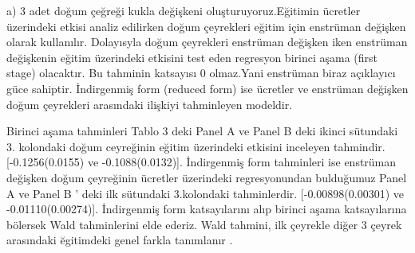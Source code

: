 \documentclass[a4paper]{article}
\begin{document}
a) 3 adet doğum çeğreği kukla değişkeni oluşturuyoruz.Eğitimin ücretler üzerindeki etkisi analiz edilirken doğum çeyrekleri eğitim için enstrüman değişken olarak kullanılır. Dolayısyla doğum çeyrekleri enstrüman değişken iken enstrüman değişkenin eğitim üzerindeki etkisini test eden regresyon birinci aşama (first stage) olacaktır. Bu tahminin katsayısı 0 olmaz.Yani enstrüman biraz açıklayıcı güce sahiptir. İndirgenmiş form (reduced form) ise ücretler ve enstrüman değişken doğum çeyrekleri arasındaki ilişkiyi tahminleyen modeldir.
\item
Birinci aşama tahminleri Tablo 3 deki Panel A ve Panel B deki ikinci sütundaki 3. kolondaki doğum ceyreğinin eğitim üzerindeki etkisini inceleyen tahmindir. [-0.1256(0.0155) ve -0.1088(0.0132)].
İndirgenmiş form tahminleri ise enstrüman değişken doğum çeyreğinin ücretler üzerindeki regresyonundan bulduğumuz Panel A ve Panel B ' deki ilk sütundaki 3.kolondaki tahminlerdir. [-0.00898(0.00301) ve -0.01110(0.00274)]. İndirgenmiş form katsayılarını alıp birinci aşama katsayılarına bölersek Wald tahminlerini elde ederiz. Wald tahmini, ilk çeyrekle diğer 3 çeyrek arasındaki ĕgitimdeki genel farkla tanımlanır
.
\item
\item
\item
\end{document}
